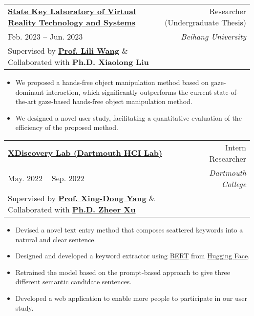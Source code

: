 \documentclass[letterpaper,11pt]{article}
\makeatletter
\newcommand{\resumeItem}[1]{
  \item\small{
    {#1 \vspace{-2pt}}
  }
}
\newcommand{\researchWithCollab}[6]{
    \item
    \begin{tabular*}{1.0\textwidth}[t]{l@{\extracolsep{\fill}}r}
      \textbf{\small{#1}} & {#2} \\
      {#3} & \textit{#4} \\
      Supervised by \textbf{\small{#5}} \& Collaborated with \textbf{\small{#6}}
    \end{tabular*}\vspace{-7pt}
}
\newcommand{\resumeItemListStart}{\begin{itemize}}
\newcommand{\resumeItemListEnd}{\end{itemize}\vspace{-5pt}}
\makeatother
\begin{document}
      \researchWithCollab
        {\href{http://vrlab.buaa.edu.cn/}{State Key Laboratory of Virtual Reality Technology and Systems}}
        {Researcher (Undergraduate Thesis)}
        {Feb. 2023 -- Jun. 2023}
        {Beihang University}
        {\href{http://liliwang.net/}{Prof. Lili Wang}}
        {Ph.D. Xiaolong Liu}
          \resumeItemListStart
            \resumeItem{We proposed a hands-free object manipulation method based on gaze-dominant interaction, which significantly outperforms the current state-of-the-art gaze-based hands-free object manipulation method. }
            \resumeItem{We designed a novel user study, facilitating a quantitative evaluation of the efficiency of the proposed method. }
          \resumeItemListEnd

      \researchWithCollab
        {\href{https://www.cs.dartmouth.edu/~hci/}{XDiscovery Lab (Dartmouth HCI Lab)}}
        {Intern Researcher}
        {May. 2022 -- Sep. 2022}
        {Dartmouth College}
        {\href{https://www.cs.dartmouth.edu/~xingdong/}{Prof. Xing-Dong Yang}}
        {\href{https://cs.dartmouth.edu/~zheer/index.html}{Ph.D. Zheer Xu}}
          \resumeItemListStart
            \resumeItem{Devised a novel text entry method that composes scattered keywords into a natural and clear sentence. }
            \resumeItem{Designed and developed a keyword extractor using \href{https://huggingface.co/bert-base-uncased}{BERT} from \href{https://huggingface.co/}{Hugging Face}. }
            \resumeItem{Retrained the model based on the prompt-based approach to give three different semantic candidate sentences. }
            \resumeItem{Developed a web application to enable more people to participate in our user study. }
          \resumeItemListEnd
\end{document}

